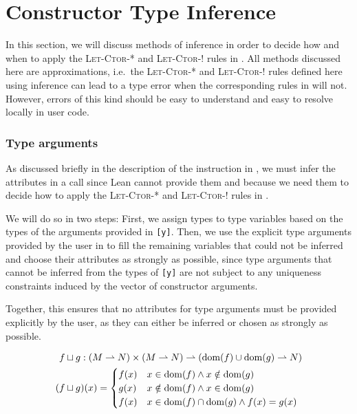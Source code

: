 \section{Constructor Type Inference}\label{sec:ctorinference}
In this section, we will discuss methods of inference in order to decide how and when to apply the \textsc{Let-Ctor-*} and \textsc{Let-Ctor-!} rules in . All methods discussed here are approximations, i.e.\ the \textsc{Let-Ctor-*} and \textsc{Let-Ctor-!} rules defined here using inference can lead to a type error when the corresponding rules in  will not. However, errors of this kind should be easy to understand and easy to resolve locally in user code.

\subsubsection{Type arguments}
As discussed briefly in the description of the  instruction in , we must infer the attributes in a  call since Lean cannot provide them and because we need them to decide how to apply the \textsc{Let-Ctor-*} and \textsc{Let-Ctor-!} rules in . 

We will do so in two steps: First, we assign types to type variables based on the types of the arguments provided in \texttt{[y]}. Then, we use the explicit type arguments provided by the user in \icode{[τ?]} to fill the remaining variables that could not be inferred and choose their attributes as strongly as possible, since type arguments that cannot be inferred from the types of \texttt{[y]} are not subject to any uniqueness constraints induced by the vector of constructor arguments. 

Together, this ensures that no attributes for type arguments must be provided explicitly by the user, as they can either be inferred or chosen as strongly as possible.

\begin{alignat*}{3}
	f &\sqcup g : (M \rightharpoonup N) \times (M \rightharpoonup N) \rightharpoonup (\mathrm{dom}(f) \cup \mathrm{dom}(g) \rightharpoonup N) \\
	(f &\sqcup g)(x) = \begin{cases}
		f(x) & x \in \mathrm{dom}(f) \land x \notin \mathrm{dom}(g) \\
		g(x) & x \notin \mathrm{dom}(f) \land x \in \mathrm{dom}(g) \\
		f(x) & x \in \mathrm{dom}(f) \cap \mathrm{dom}(g) \land f(x) = g(x)
	\end{cases}
\end{alignat*}

